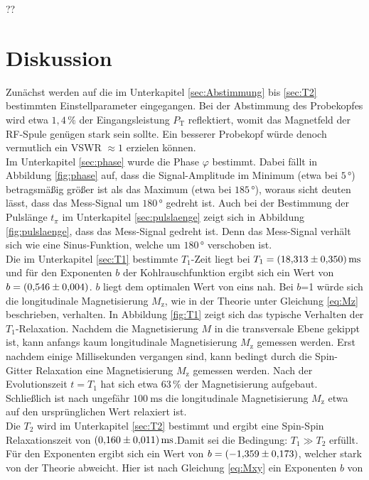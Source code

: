 ??\section{Diskussion}
\label{sec:Diskussion}
Zunächst werden auf die im Unterkapitel \ref{sec:Abstimmung} bis \ref{sec:T2}
bestimmten Einstellparameter eingegangen.
Bei der Abstimmung des Probekopfes wird etwa $1,4\,\%$ der Eingangsleistung
$P_{\text{T}}$ reflektiert, womit das Magnetfeld der RF-Spule genügen stark sein
sollte. Ein besserer Probekopf würde denoch vermutlich ein VSWR $\approx1$ erzielen
können.\\
Im Unterkapitel \ref{sec:phase} wurde die Phase $\varphi$ bestimmt. Dabei fällt
in Abbildung \ref{fig:phase} auf, dass die Signal-Amplitude im Minimum (etwa bei $5\,°$)
betragsmäßig größer ist als das Maximum (etwa bei $185\,°$), woraus sicht deuten
lässt, dass das Mess-Signal um $180\,°$ gedreht ist.
Auch bei der Bestimmung der Pulslänge $t_{\pi}$ im Unterkapitel \ref{sec:pulslaenge}
zeigt sich in Abbildung \ref{fig:pulslaenge}, dass das Mess-Signal gedreht ist.
Denn das Mess-Signal verhält sich wie eine Sinus-Funktion, welche um $180\,°$
verschoben ist.\\
Die im Unterkapitel \ref{sec:T1} bestimmte $T_1$-Zeit liegt bei
$T_1 = \SI{18.313\pm0.350}{\milli\second}$ und für den Exponenten $b$ der
Kohlrauschfunktion ergibt sich ein Wert von $b = \SI{0,546\pm0,004}{}$. $b$ liegt
dem optimalen Wert von eins nah. Bei $b$=1 würde sich die longitudinale
Magnetisierung $M_{\text{z}}$, wie in der Theorie unter Gleichung \ref{eq:Mz}
beschrieben, verhalten. In Abbildung \ref{fig:T1} zeigt sich das typische Verhalten
der $T_1$-Relaxation. Nachdem die Magnetisierung $M$ in die transversale Ebene gekippt ist,
kann anfangs kaum longitudinale Magnetisierung $M_{\text{z}}$ gemessen werden.
Erst nachdem einige Millisekunden vergangen sind, kann bedingt durch die Spin-Gitter
Relaxation eine Magnetisierung $M_{\text{z}}$ gemessen werden. Nach der Evolutionszeit
$t=T_1$ hat sich etwa $63\,\%$ der Magnetisierung aufgebaut. Schließlich ist nach
ungefähr $\SI{100}{\milli\second}$ die longitudinale Magnetisierung $M_{\text{z}}$
etwa auf den ursprünglichen Wert relaxiert ist.\\
Die $T_2$ wird im Unterkapitel \ref{sec:T2} bestimmt und ergibt eine Spin-Spin
Relaxationszeit von $\SI{0.160\pm0.011}{\milli\second}$.Damit sei die Bedingung:
$T_1 \gg T_2$ erfüllt.
Für den Exponenten ergibt sich ein Wert von $b = \SI{-1,359\pm0,173}{}$, welcher
stark von der Theorie abweicht. Hier ist nach Gleichung \ref{eq:Mxy} ein Exponenten $b$ von
